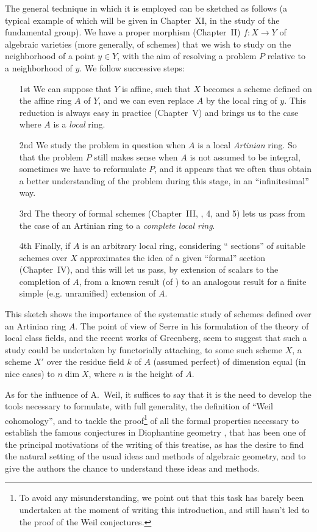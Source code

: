 The general technique in which it is employed can be sketched as follows (a
typical example of which will be given in Chapter~XI, in the study of the
fundamental group). We have a proper morphism (Chapter~II) $f:X\to Y$ of
algebraic varieties (more generally, of schemes) that we wish to study on the
neighborhood of a point $y\in Y$, with the aim of resolving a problem $P$
relative to a neighborhood of $y$. We follow successive steps:
\begin{enumerate}
  \item[1st]
    We can suppose that $Y$ is affine, such that $X$ becomes a scheme
    defined on the affine ring $A$ of $Y$, and we can even replace $A$
    by the local ring of $y$. This reduction is always easy in practice
    (Chapter~V) and brings us to the case where $A$ is a {\em local} ring.
  \item[2nd]
    We study the problem in question when $A$ is a local {\em Artinian}
    ring. So that the problem $P$ still makes sense when $A$ is not
    assumed to be integral, sometimes we have to reformulate $P$, and it
    appears that we often thus obtain a better understanding of the problem
    during this stage, in an ``infinitesimal'' way.
  \item[3rd]
    The theory of formal schemes
    (Chapter~III, \textsection{}, 4, and 5) lets us pass from the
    case of an Artinian ring to a {\em complete local ring}.
  \item[4th]
    Finally, if $A$ is an arbitrary local ring, considering
    `` sections'' of suitable schemes over $X$
    approximates the idea of a given ``formal'' section (Chapter~IV), and
    this will let us pass,
    by extension of scalars to the completion of $A$, from a known result (of
    \completelyunsure) to an analogous result for a finite simple
    (e.g. unramified) extension of $A$.
\end{enumerate}

This sketch shows the importance of the systematic study of schemes defined over
an Artinian ring $A$. The point of view of Serre in his formulation of the
theory of local class fields, and the recent works of Greenberg, seem
to suggest that such a study could be undertaken by functorially attaching, to
some such scheme $X$, a scheme $X'$ over the residue field $k$ of $A$ (assumed
perfect) of dimension equal (in nice cases) to $n\dim X$, where $n$ is
the height of $A$.

As for the influence of A.~Weil, it suffices to say that it is the need to
develop the tools necessary to formulate, with full generality, the definition
of ``Weil cohomology'', and to tackle the proof\footnote{To avoid any
misunderstanding, we point out that this task has barely been undertaken at the
moment of writing this introduction, and still hasn't led to the proof of the
Weil conjectures.} of all the formal properties necessary to establish the
famous conjectures in Diophantine geometry \cite{I-19}, that has been one of the
principal motivations of the writing of this treatise, as has the desire to find
the natural setting of the usual ideas and methods of algebraic geometry, and to
give the authors the chance to understand these ideas and methods.

